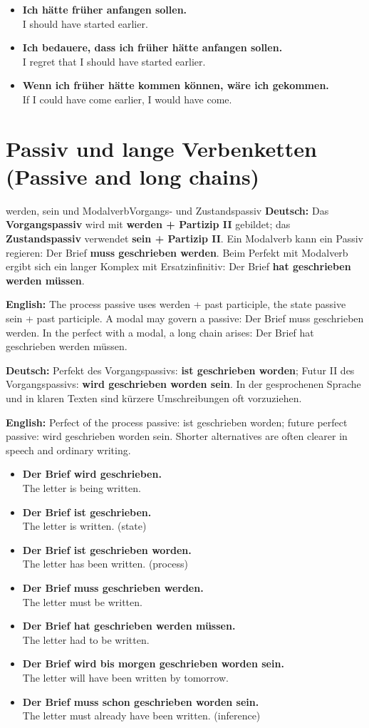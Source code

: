 \documentclass[a4paper,11pt]{article}
\newcommand{\GermanText}[1]{\textbf{Deutsch: }#1\par}
\newcommand{\EnglishText}[1]{{\small\color{SoftGray}\textbf{English: }#1\par}}
\newcommand{\ExampleItem}[2]{\item \textbf{#1}\\{\small\color{SoftGray}#2}}
\newcommand{\DEEN}[2]{\GermanText{#1}\EnglishText{#2}}
\newcommand{\Pair}[2]{\ExampleItem{#1}{#2}}
\begin{document}
\begin{exbox}\begin{itemize}
\Pair{Ich hätte früher anfangen sollen.}{I should have started earlier.}
\Pair{Ich bedauere, dass ich früher hätte anfangen sollen.}{I regret that I should have started earlier.}
\Pair{Wenn ich früher hätte kommen können, wäre ich gekommen.}{If I could have come earlier, I would have come.}
\end{itemize}\end{exbox}

\section{Passiv und lange Verbenketten \textnormal{(Passive and long chains)}}
\begin{grammarentry}{werden, sein und Modalverb}{Vorgangs- und Zustandspassiv}
\DEEN{Das \textbf{Vorgangspassiv} wird mit \textbf{werden + Partizip II} gebildet; das \textbf{Zustandspassiv} verwendet \textbf{sein + Partizip II}. Ein Modalverb kann ein Passiv regieren: \glqq Der Brief \textbf{muss geschrieben werden}\grqq. Beim Perfekt mit Modalverb ergibt sich ein langer Komplex mit Ersatzinfinitiv: \glqq Der Brief \textbf{hat geschrieben werden müssen}\grqq.}{The process passive uses werden + past participle, the state passive sein + past participle. A modal may govern a passive: Der Brief muss geschrieben werden. In the perfect with a modal, a long chain arises: Der Brief hat geschrieben werden müssen.}
\DEEN{Perfekt des Vorgangspassivs: \textbf{ist geschrieben worden}; Futur II des Vorgangspassivs: \textbf{wird geschrieben worden sein}. In der gesprochenen Sprache und in klaren Texten sind kürzere Umschreibungen oft vorzuziehen.}{Perfect of the process passive: ist geschrieben worden; future perfect passive: wird geschrieben worden sein. Shorter alternatives are often clearer in speech and ordinary writing.}
\end{grammarentry}
\begin{exbox}\begin{itemize}
\Pair{Der Brief wird geschrieben.}{The letter is being written.}
\Pair{Der Brief ist geschrieben.}{The letter is written. (state)}
\Pair{Der Brief ist geschrieben worden.}{The letter has been written. (process)}
\Pair{Der Brief muss geschrieben werden.}{The letter must be written.}
\Pair{Der Brief hat geschrieben werden müssen.}{The letter had to be written.}
\Pair{Der Brief wird bis morgen geschrieben worden sein.}{The letter will have been written by tomorrow.}
\Pair{Der Brief muss schon geschrieben worden sein.}{The letter must already have been written. (inference)}
\end{itemize}\end{exbox}
\end{document}
